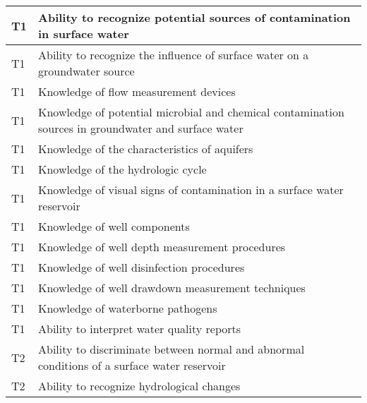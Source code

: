 \begin{table}[H]
\begin{tabular}{| m{1cm} |m{15cm} |}
T1 & Ability to recognize   potential sources of contamination in surface water                                                        \\ \hline
T1 & Ability to recognize   the influence of surface water on a groundwater source                                                     \\ \hline
T1 & Knowledge of flow   measurement devices                                                                                           \\ \hline
T1 & Knowledge of   potential microbial and chemical contamination sources in groundwater and   surface water                          \\ \hline
T1 & Knowledge of the   characteristics of aquifers                                                                                    \\ \hline
T1 & Knowledge of the   hydrologic cycle                                                                                               \\ \hline
T1 & Knowledge of visual   signs of contamination in a surface water reservoir                                                         \\ \hline
T1 & Knowledge of well   components                                                                                                    \\ \hline
T1 & Knowledge of well   depth measurement procedures                                                                                  \\ \hline
T1 & Knowledge of well   disinfection procedures                                                                                       \\ \hline
T1 & Knowledge of well   drawdown measurement techniques                                                                               \\ \hline
T1 & Knowledge of   waterborne pathogens                                                                                               \\ \hline
T1 & Ability to interpret   water quality reports                                                                                      \\ \hline
T2 & Ability to   discriminate between normal and abnormal conditions of a surface water   reservoir                                   \\ \hline
T2 & Ability to recognize   hydrological changes                                                                                       \\ \hline

\end{tabular}
\end{table}
